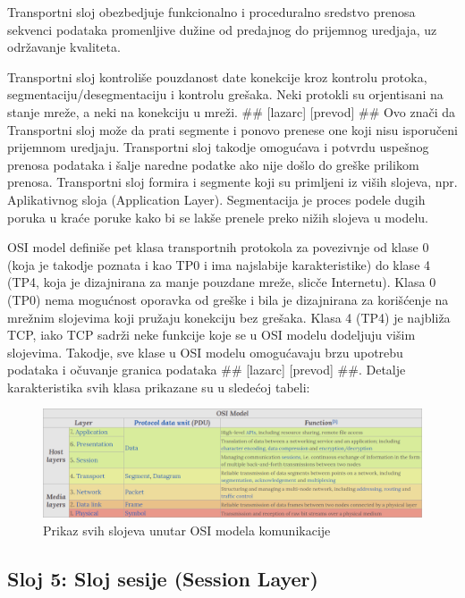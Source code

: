 \documentclass[a4paper,12pt, master]{etf}
\begin{document}
	Transportni sloj obezbedjuje funkcionalno i proceduralno sredstvo prenosa
	sekvenci podataka promenljive du\v{z}ine od predajnog do prijemnog uredjaja,
	 uz odr\v{z}avanje kvaliteta.

	Transportni sloj kontroli\v{s}e pouzdanost date konekcije kroz kontrolu
	protoka, segmentaciju/desegmentaciju i kontrolu gre\v{s}aka. Neki protokli
	su orjentisani na stanje mre\v{z}e, a neki na konekciju u mre\v{z}i.
	\#\# [lazarc] [prevod] \#\# Ovo zna\v{c}i da Transportni sloj mo\v{z}e da
	prati segmente i ponovo prenese one koji nisu isporu\v{c}eni prijemnom
	uredjaju. Transportni sloj takodje omogu\'{c}ava i potvrdu uspe\v{s}nog
	prenosa podataka i \v{s}alje naredne podatke ako nije do\v{s}lo do
	gre\v{s}ke prilikom prenosa. Transportni sloj formira i segmente koji su
	primljeni iz vi\v{s}ih slojeva, npr. Aplikativnog sloja (Application Layer).
	Segmentacija je proces podele dugih poruka u kra\'{c}e poruke kako bi se
	lak\v{s}e prenele preko	ni\v{z}ih slojeva u modelu.

	OSI model defini\v{s}e pet klasa transportnih protokola za povezivnje od
	klase 0 (koja je takodje poznata i kao TP0 i ima najslabije karakteristike)
	do klase 4 (TP4, koja je dizajnirana za manje pouzdane mre\v{z}e,
	slic\v{c}e Internetu). Klasa 0 (TP0) nema mogu\'{c}nost	oporavka od
	gre\v{s}ke i bila je dizajnirana za kori\v{s}\'{c}enje na mre\v{z}nim
	slojevima koji pru\v{z}aju konekciju bez gre\v{s}aka. Klasa 4 (TP4) je
	najbli\v{z}a TCP, iako TCP sadr\v{z}i neke funkcije koje se u OSI modelu
	dodeljuju vi\v{s}im slojevima. Takodje, sve klase u OSI modelu
	omogu\'{c}avaju	brzu upotrebu podataka i o\v{c}uvanje granica podataka
	\#\# [lazarc] [prevod] \#\#. Detalje karakteristika svih klasa prikazane su
	u slede\'{c}oj tabeli:

	\begin{figure}[htb]
			\centering
			\includegraphics[scale=.43]{../pic/osi_model.png}
			\caption{Prikaz svih slojeva unutar OSI modela komunikacije}
			\label{fig:osi_model}
	\end{figure}

	\subsection{Sloj 5: Sloj sesije (Session Layer)}
\end{document}

